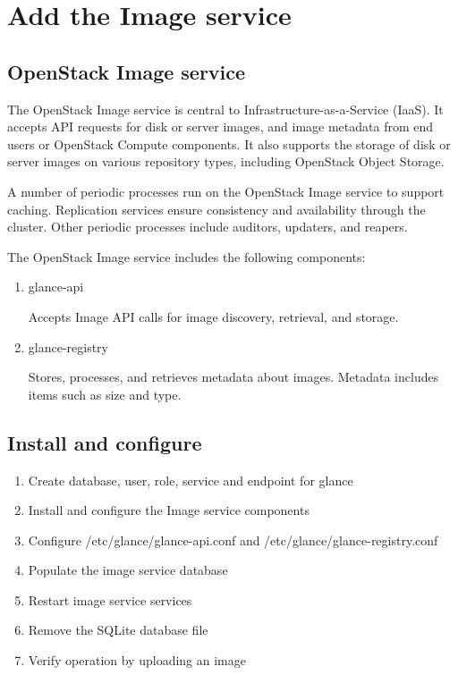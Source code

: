 \section{Add the Image service}
    \subsection{OpenStack Image service}
    \par The OpenStack Image service is central to Infrastructure-as-a-Service (IaaS). It accepts API requests for disk or server images, and image metadata from end users or OpenStack Compute components. It also supports the storage of disk or server images on various repository types, including OpenStack Object Storage.

    \par A number of periodic processes run on the OpenStack Image service to support caching. Replication services ensure consistency and availability through the cluster. Other periodic processes include auditors, updaters, and reapers.
    
    \par The OpenStack Image service includes the following components:
    
    \begin{enumerate}
    \item glance-api
    \par Accepts Image API calls for image discovery, retrieval, and storage.
    
    \item glance-registry
    \par Stores, processes, and retrieves metadata about images. Metadata includes items such as size and type.
    \end{enumerate}
    \subsection{Install and configure}
        \begin{enumerate}
            \item Create database, user, role, service and endpoint for glance
            \item Install and configure the Image service components
            \item Configure /etc/glance/glance-api.conf and /etc/glance/glance-registry.conf
            \item Populate the image service database
            \item Restart image service services
            \item Remove the SQLite database file
            \item Verify operation by uploading an image
        \end{enumerate}
